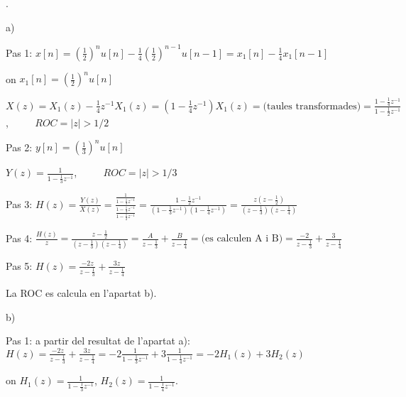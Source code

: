 \documentclass{article}
\begin{document}
.
\begin{description}

\item{a)}
\begin{description}
\item{Pas 1:    }
$
\displaystyle
x[n]=\left(\frac{1}{2}\right)^n u[n] - \frac{1}{4} \left(\frac{1}{2}\right)^{n-1} u[n-1] = x_1[n] - \frac{1}{4} x_1[n-1]
$

on $x_1[n]=(\frac{1}{2})^n u[n]$

$
\displaystyle
X(z)=X_1(z) - \frac{1}{4} z^{-1} X_1(z)=(1-\frac{1}{4}z^{-1})X_1(z)=\text{(taules transformades)}=\frac{1-\frac{1}{4}z^{-1}}{1-\frac{1}{2}z^{-1}}
$, $\qquad$ $ROC=|z|>1/2$

\item{Pas 2:    }
$
\displaystyle
y[n]=\left(\frac{1}{3}\right)^n u[n]
$

$
\displaystyle
Y(z)=\frac{1}{1-\frac{1}{3}z^{-1}}
$, $\qquad$ $ROC=|z|>1/3$

\item{Pas 3:    }
$
\displaystyle
H(z)=\frac{Y(z)}{X(z)}=\frac{ \frac{1}{1-\frac{1}{3}z^{-1}} }{ \frac{1-\frac{1}{4}z^{-1}}{1-\frac{1}{2}z^{-1}} }=
\frac{1-\frac{1}{2}z^{-1}}{(1-\frac{1}{3}z^{-1})(1-\frac{1}{4}z^{-1})} = \frac{z(z-\frac{1}{2})}{(z-\frac{1}{3})(z-\frac{1}{4})}
$

\item{Pas 4:    }
$
\displaystyle
\frac{H(z)}{z}=\frac{z-\frac{1}{2}}{(z-\frac{1}{3})(z-\frac{1}{4})}=\frac{A}{z-\frac{1}{3}}+\frac{B}{z-\frac{1}{4}}=
\text{(es calculen A i B)}=\frac{-2}{z-\frac{1}{3}}+\frac{3}{z-\frac{1}{4}}
$

\item{Pas 5:    } 
$
\displaystyle
H(z)=\frac{-2z}{z-\frac{1}{3}}+\frac{3z}{z-\frac{1}{4}}
$

La ROC es calcula en l'apartat b).

\end{description}

\item{b)}
\begin{description}
\item{Pas 1:    } a partir del resultat de l'apartat a):
$
\displaystyle
H(z)=\frac{-2z}{z-\frac{1}{3}}+\frac{3z}{z-\frac{1}{4}}=-2\frac{1}{1-\frac{1}{3}z^{-1}}+3\frac{1}{1-\frac{1}{4}z^{-1}}=-2H_1(z)+3H_2(z)
$

on $\displaystyle H_1(z)=\frac{1}{1-\frac{1}{3}z^{-1}}$, $\displaystyle H_2(z)=\frac{1}{1-\frac{1}{4}z^{-1}}$.


\end{description}
\end{description}
\end{document}
